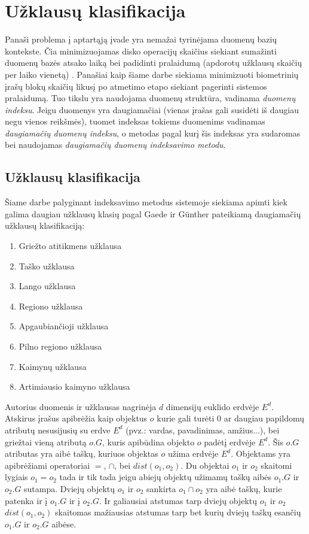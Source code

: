 \section{Užklausų klasifikacija}

Panaši problema į aptartąją įvade yra nemažai tyrinėjama duomenų bazių kontekste.
Čia minimizuojamas disko operacijų skaičius siekiant sumažinti duomenų bazės atsako laiką bei padidinti pralaidumą (apdorotų užklausų skaičių per laiko vienetą) \cite{garcia2000database}.
Panašiai kaip šiame darbe siekiama minimizuoti biometrinių įrašų blokų skaičių likusį po atmetimo etapo siekiant pagerinti sistemos \cite{NeurotechnologyMegamatcherAccelerator} pralaidumą.
Tuo tikslu yra naudojama duomenų struktūra, vadinama {\it duomenų indeksu}.
Jeigu duomenys yra daugiamačiai (vienas įrašas gali susidėti iš daugiau negu vienos reikšmės), tuomet indeksas tokiems duomenims vadinamas {\it daugiamačių duomenų indeksu}, o metodas pagal kurį šis indeksas yra sudaromas bei naudojamas {\it daugiamačių duomenų indeksavimo metodu}.

\subsection{Užklausų klasifikacija}

Šiame darbe palyginant indeksavimo metodus sistemoje \cite{NeurotechnologyMegamatcherAccelerator} siekiama apimti kiek galima daugiau užklausų klasių pagal Gaede ir Günther \cite{gaede1998multidimensional} pateikiamą daugiamačių užklausų klasifikaciją:
\begin{enumerate}
	\item Griežto atitikmens užklausa
	\item Taško užklausa
	\item Lango užklausa
	\item Regiono užklausa
	\item Apgaubiančioji užklausa
	\item Pilno regiono užklausa
	\item Kaimynų užklausa
	\item Artimiausio kaimyno užklausa
\end{enumerate}

Autorius duomenis ir užklausas nagrinėja $d$ dimensijų euklido erdvėje $E^d$.
Atskirus įrašus apibrėžia kaip objektus $o$ kurie gali turėti 0 ar daugiau papildomų atributų nesusijusių su erdve $E^d$ (pvz.: vardas, pavadinimas, amžius...), bei griežtai vieną atributą $o.G$, kuris apibūdina objekto $o$ padėtį erdvėje $E^d$.
Šis $o.G$ atributas yra aibė taškų, kuriuos objektas $o$ užima erdvėje $E^d$.
Objektams yra apibrėžiami operatoriai $=$, $\cap$, bei $dist(o_1, o_2)$.
Du objektai $o_1$ ir $o_2$ skaitomi lygiais $o_1 = o_2$ tada ir tik tada jeigu abiejų objektų užimamų taškų aibės $o_1.G$ ir $o_2.G$ sutampa.
Dviejų objektų $o_1$ ir $o_2$ sankirta $o_1 \cap o_2$ yra aibė taškų, kurie patenka ir į $o_1.G$ ir į $o_2.G$.
Ir galiausiai atstumas tarp dviejų objektų $o_1$ ir $o_2$ $dist(o_1, o_2)$ skaitomas mažiausias atstumas tarp bet kurių dviejų taškų esančių $o_1.G$ ir $o_2.G$ aibėse.



